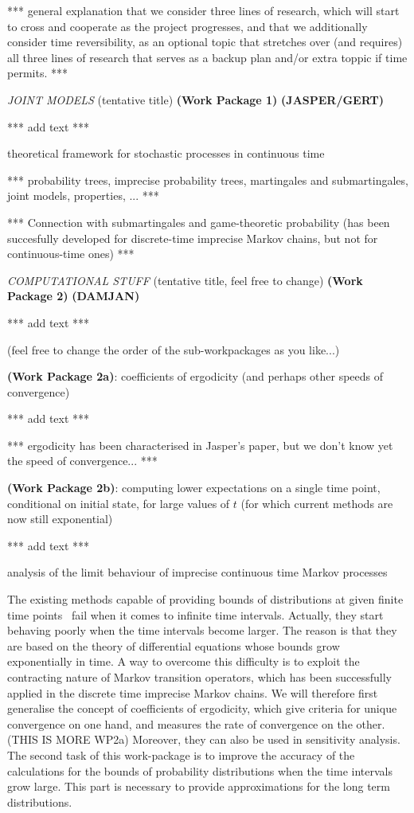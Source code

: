 \documentclass[11pt,dvipsnames,usenames,a4paper]{article}
\begin{document}
*** general explanation that we consider three lines of research, which will start to cross and cooperate as the project progresses, and that we additionally consider time reversibility, as an optional topic that stretches over (and requires) all three lines of research that serves as a backup plan and/or extra toppic if time permits. ***

\emph{JOINT MODELS} (tentative title) {\bf (Work Package 1)} {\bf\color{blue} (JASPER/GERT)}

*** add text ***

theoretical framework for stochastic processes in continuous time

*** probability trees, imprecise probability trees, martingales and submartingales, joint models, properties, ... ***

*** Connection with submartingales and game-theoretic probability (has been succesfully developed for discrete-time imprecise Markov chains, but not for continuous-time ones) ***


\emph{COMPUTATIONAL STUFF} (tentative title, feel free to change) {\bf (Work Package 2)}
{\bf\color{blue} (DAMJAN)}

*** add text ***

(feel free to change the order of the sub-workpackages as you like...)

{\bf (Work Package 2a)}: coefficients of ergodicity (and perhaps other speeds of convergence)

*** add text ***

*** ergodicity has been characterised in Jasper's paper, but we don't know yet the speed of convergence... ***

{\bf (Work Package 2b)}: computing lower expectations on a single time point, conditional on initial state, for large values of $t$ (for which current methods are now still exponential)

*** add text ***


analysis of the limit behaviour of imprecise continuous time Markov processes

The existing methods capable of providing bounds of distributions at given finite time points~\cite{Skulj2015} fail when it comes to infinite time intervals. Actually, they start behaving poorly when the time intervals become larger. The reason is that they are based on the theory of differential equations whose bounds grow exponentially in time. A way to overcome this difficulty is to exploit the contracting nature of Markov transition operators, which has been successfully applied in the discrete time imprecise Markov chains. We will therefore first generalise the concept of coefficients of ergodicity, which give criteria for unique convergence on one hand, and measures the rate of convergence on the other. (THIS IS MORE WP2a) Moreover, they can also be used in sensitivity analysis. The second task of this work-package is to improve the accuracy of the calculations for the bounds of probability distributions when the time intervals grow large. This part is necessary to provide approximations for the long term distributions.
\end{document}
